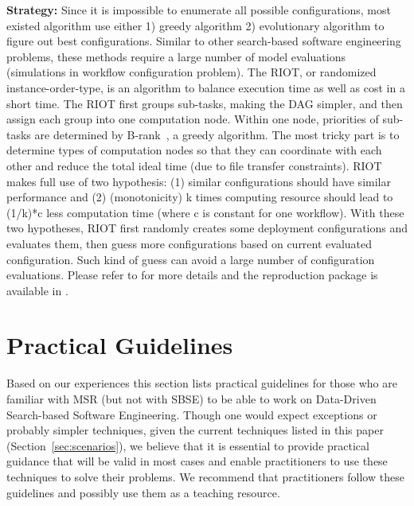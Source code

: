 \documentclass[sigconf,anonymous,review]{acmart}
\newcommand\TODO[1]{\textcolor{ScarletRed}{\textbf{\colorbox{yellow}{\small TODO:}} \emph{#1}}\xspace}
\begin{document}
\noindent\textbf{Strategy:} 
Since it is impossible to enumerate all possible configurations, most existed algorithm use either 1) greedy algorithm 2) evolutionary algorithm to figure out best configurations.
Similar to other search-based software engineering problems,
these methods require a large number of model evaluations (simulations in workflow configuration problem).
The RIOT, or randomized instance-order-type, is an algorithm to balance execution time as well as cost
in a short time.
The RIOT first groups sub-tasks, making the DAG simpler, and then
assign each group into one computation node. Within one node,
priorities of sub-tasks are determined by
B-rank~\cite{topcuoglu2002performance}, a greedy algorithm. 
The most tricky part is to determine types of computation nodes so that they can coordinate with each other and reduce the total ideal time (due to file transfer constraints).
RIOT makes full use of two hypothesis: (1) similar configurations should have similar performance and (2) (monotonicity) k times computing resource should lead to (1/k)*c less computation time (where c is constant for one workflow).
With these two hypotheses,
RIOT first randomly creates some deployment configurations and evaluates them, then guess more configurations based on current evaluated configuration. Such kind of guess can avoid a large number of configuration evaluations. Please refer to \cite{chen2017riot} for more details and the reproduction package is available in .


\section{Practical Guidelines} \label{sec:guide}



Based on our experiences this section lists practical guidelines for those who are familiar with MSR (but not with SBSE) to be able to work on Data-Driven Search-based Software Engineering. 
Though one would expect exceptions or probably simpler techniques, given the current techniques listed in this paper (Section~\ref{sec:scenarios}), we believe that it is essential to provide practical guidance that will be valid in most cases and enable practitioners to use these techniques to solve their problems. 
We recommend that practitioners follow these guidelines and possibly use them as a teaching resource.
\end{document}
